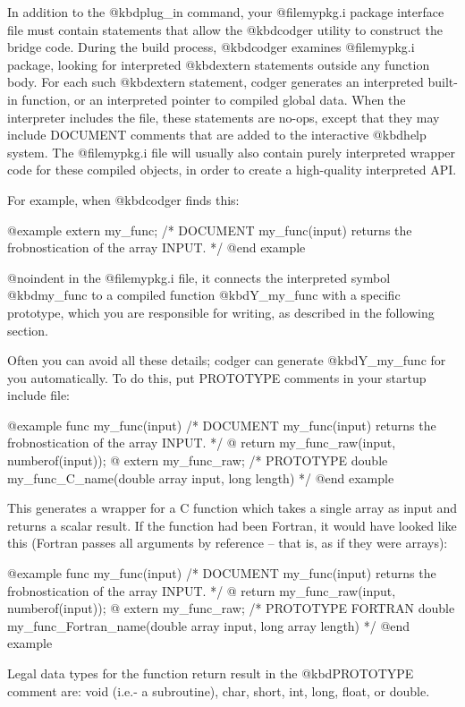 In addition to the @kbd{plug_in} command, your @file{mypkg.i} package
interface file must contain statements that allow the @kbd{codger}
utility to construct the bridge code.  During the build process,
@kbd{codger} examines @file{mypkg.i} package, looking for interpreted
@kbd{extern} statements outside any function body.  For each such
@kbd{extern} statement, codger generates an interpreted built-in
function, or an interpreted pointer to compiled global data.  When the
interpreter includes the file, these statements are no-ops, except
that they may include DOCUMENT comments that are added to the
interactive @kbd{help} system.  The @file{mypkg.i} file will usually
also contain purely interpreted wrapper code for these compiled
objects, in order to create a high-quality interpreted API.

For example, when @kbd{codger} finds this:

@example
extern my_func;
/* DOCUMENT my_func(input)
     returns the frobnostication of the array INPUT.
 */
@end example

@noindent
in the @file{mypkg.i} file, it connects the interpreted symbol
@kbd{my_func} to a compiled function @kbd{Y_my_func} with a specific
prototype, which you are responsible for writing, as described in the
following section.

Often you can avoid all these details; codger can generate
@kbd{Y_my_func} for you automatically.  To do this, put PROTOTYPE
comments in your startup include file:

@example
func my_func(input)
/* DOCUMENT my_func(input)
     returns the frobnostication of the array INPUT.
 */
@{
  return my_func_raw(input, numberof(input));
@}
extern my_func_raw;
/* PROTOTYPE
   double my_func_C_name(double array input, long length)
 */
@end example

This generates a wrapper for a C function which takes a single array as
input and returns a scalar result.  If the function had been Fortran,
it would have looked like this (Fortran passes all arguments by reference
-- that is, as if they were arrays):

@example
func my_func(input)
/* DOCUMENT my_func(input)
     returns the frobnostication of the array INPUT.
 */
@{
  return my_func_raw(input, numberof(input));
@}
extern my_func_raw;
/* PROTOTYPE FORTRAN
   double my_func_Fortran_name(double array input, long array length)
 */
@end example

Legal data types for the function return result in the @kbd{PROTOTYPE}
comment are: void (i.e.- a subroutine), char, short, int, long, float,
or double.

